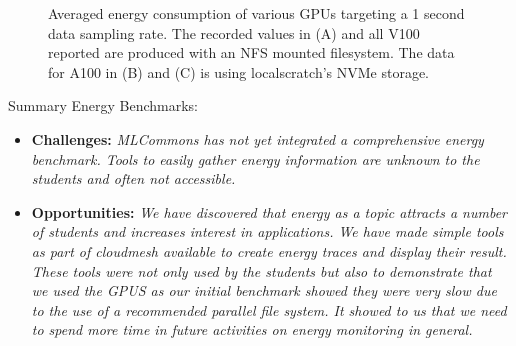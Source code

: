 \begin{figure}[htb]
  \begin{center}
  \end{center}
  \caption{Averaged energy consumption of various GPUs targeting a 1 second data sampling rate. The recorded values in (A) and all V100 reported are produced with an NFS mounted filesystem.  The data for A100 in (B) and (C) is using localscratch's NVMe storage.} 
  \label{fig:energy-graphs-compare}
\end{figure}


\begin{tcolorbox}
Summary Energy Benchmarks:

\begin{itemize}
\item {\bf Challenges:} {\it MLCommons has not yet integrated a comprehensive energy benchmark. Tools to easily gather energy information are unknown to the students and often not accessible.}
\item {\bf Opportunities:} {\it We have discovered that energy as a topic attracts a number of students and increases interest in applications. We have made simple tools as part of cloudmesh available to create energy traces and display their result. These tools were not only used by the students but also to demonstrate that we used the GPUS as our initial benchmark showed they were very slow due to the use of a recommended parallel file system. It showed to us that we need to spend more time in future activities on energy monitoring in general.}
\end{itemize}
\end{tcolorbox}


